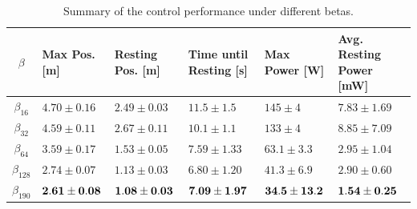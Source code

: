 \documentclass[letterpaper, 10 pt, conference]{ieeeconf}  %
\begin{document}
\begin{table}[h!]
\centering
\caption{\label{tab:control_performance} Summary of the control performance under different betas.}
\vspace{-\baselineskip}
\begin{tabular}{c|p{0.9cm}|p{1.0cm}|p{1.4cm}|p{1.0cm}|p{1.5cm}}
$\beta$ & Max Pos. [m] & Resting Pos. [m] & Time until Resting [s] & Max Power [W] & Avg. Resting Power [mW] \\
\hline
\hline
$\beta_{16}$ &  $4.70 \pm 0.16$ & $2.49 \pm 0.03$ & $11.5 \pm 1.5$  &  $145 \pm 4$ & $7.83 \pm 1.69$\\
\hline
$\beta_{32}$ & $4.59 \pm 0.11$ & $2.67 \pm 0.11$ & $10.1 \pm 1.1$  &  $133 \pm 4$ & $8.85 \pm 7.09$\\
\hline
$\beta_{64}$ & $3.59 \pm 0.17$ & $1.53 \pm 0.05$ & $7.59 \pm 1.33$  &  $63.1 \pm 3.3$ & $2.95 \pm 1.04$\\
\hline
$\beta_{128}$ & $2.74 \pm 0.07$ & $1.13 \pm 0.03$ & $6.80 \pm 1.20$  &  $41.3 \pm 6.9$ & $2.90 \pm 0.60$\\
\hline
$\beta_{190}$ & $\bf 2.61 \pm 0.08$ & $\bf 1.08 \pm 0.03$ & $\bf 7.09 \pm 1.97$  & $\bf 34.5 \pm 13.2$ & $\bf 1.54 \pm 0.25$ \\
\end{tabular}
\end{table}

\end{document}
